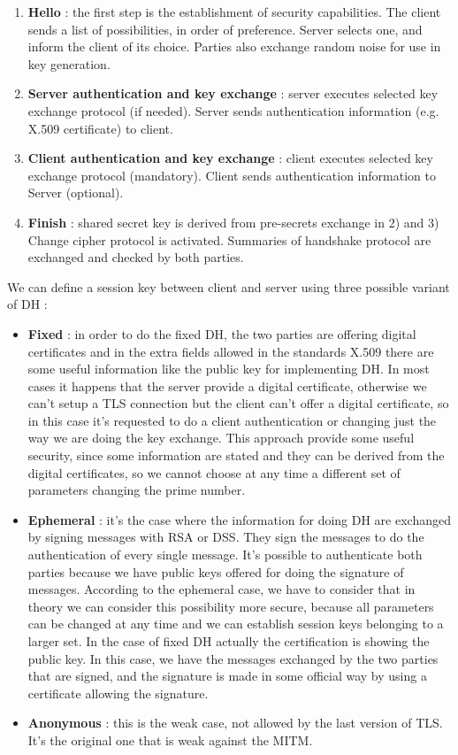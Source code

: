 \documentclass[11pt]{article}
\begin{document}
\begin{enumerate}
\item \textbf{Hello} : the first step is the establishment of security capabilities. The client sends a list of possibilities, in order of preference. Server selects one, and inform the client of its choice. Parties also exchange random noise for use in key generation.
\item \textbf{Server authentication and key exchange} : server executes selected key exchange protocol (if needed). Server sends authentication information (e.g. X.509 certificate) to client.
\item \textbf{Client authentication and key exchange} : client executes selected key exchange protocol (mandatory). Client sends authentication information to Server (optional).
\item \textbf{Finish} : shared secret key is derived from pre-secrets exchange in 2) and 3) Change cipher protocol is activated. Summaries of handshake protocol are exchanged and checked by both parties.
\end{enumerate}
We can define a session key between client and server using three possible variant of DH :
\begin{itemize}
\item \textbf{Fixed} : in order to do the fixed DH, the two parties are offering digital certificates and in the extra fields allowed in the standards X.509 there are some useful information like the public key for implementing DH. In most cases it happens that the server provide a digital certificate, otherwise we can't setup a TLS connection but the client can't offer a digital certificate, so in this case it's requested to do a client authentication or changing just the way we are doing the key exchange. This approach provide some useful security, since some information are stated and they can be derived from the digital certificates, so we cannot choose at any time a different set of parameters changing the prime number.
\item \textbf{Ephemeral} : it's the case where the information for doing DH are exchanged by signing messages with RSA or DSS. They sign the messages to do the authentication of every single message. It's possible to authenticate both parties because we have public keys offered for doing the signature of messages. According to the ephemeral case, we have to consider that in theory we can consider this possibility more secure, because all parameters can be changed at any time and we can establish session keys belonging to a larger set. In the case of fixed DH actually the certification is showing the public key. In this case, we have the messages exchanged by the two parties that are signed, and the signature is made in some official way by using a certificate allowing the signature.
\item \textbf{Anonymous} : this is the weak case, not allowed by the last version of TLS. It's the original one that is weak against the MITM.
\end{itemize}
\end{document}
